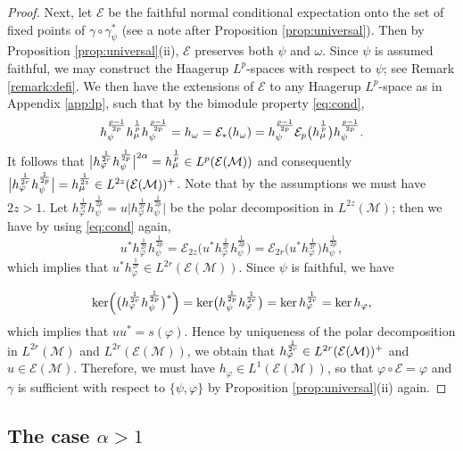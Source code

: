 \documentclass[12pt]{article}
\theoremstyle{definition}
\theoremstyle{remark}
\numberwithin{equation}{section}
\def\cE{\mathcal E}
\def\Me{\mathcal M}
\def\ffi{\varphi}
\begin{document}
\begin{proof}
Next, let $\mathcal E$ be the faithful  normal conditional expectation onto the
set of fixed points of $\gamma\circ\gamma^*_\psi$ (see a note after Proposition \ref{prop:universal}). Then
by Proposition \ref{prop:universal}(ii), $\mathcal E$ preserves both $\psi$ and $\omega$.
Since $\psi$ is assumed faithful, we may construct the Haagerup $L^p$-spaces with respect
to $\psi$; see Remark \ref{remark:defi}. We then have the extensions of $\cE$ to any Haagerup
$L^p$-space as in Appendix \ref{app:lp}, such that  by the bimodule property
\eqref{eq:cond}, 
\[
h_\psi^{p-1\over 2p}h_\mu^{\frac1p}h_\psi^{p-1\over 2p}=h_\omega=\mathcal
E_*(h_\omega)=h_\psi^{p-1\over 2p}\cE_p\bigl(h_\mu^{\frac1p}\bigr)h_\psi^{p-1\over 2p}.
\]
It follows that $\big|h_\ffi^{1\over 2r}h_\psi^{1\over 2p}\big|^{2\alpha}= h_\mu^{\frac1p}\in
L^p(\cE(\Me))$ and consequently $\big|h_\varphi^{\frac1{2r}}h_\psi^{\frac1{2p}}\big|=h_\mu^{1\over
2z}\in L^{2z}(\mathcal E(\Me))^+$. Note that by the  assumptions we must have $2z>1$. 
Let  $h_\varphi^{\frac1{2r}}h_\psi^{\frac1{2p}}=u\big|h_\varphi^{\frac1{2r}}h_\psi^{\frac1{2p}}\big|$ be the
polar decomposition in $L^{2z}(\Me)$; then we have by using \eqref{eq:cond} again,
\[
u^*h_\varphi^{\frac1{2r}}h_\psi^{\frac1{2p}}=\mathcal
E_{2z}\bigl(u^*h_\varphi^{\frac1{2r}}h_\psi^{\frac1{2p}}\bigr)=\mathcal
E_{2r}\bigl(u^*h_\varphi^{\frac1{2r}}\bigr)h_\psi^{\frac1{2p}},
\]
which implies that $u^*h_\varphi^{\frac1{2r}}\in L^{2r}(\cE(\Me))$. Since $\psi$ is
faithful, we have

\[
\ker\Bigl(\bigl(h_\ffi^{1\over2r}h_\psi^{1\over2p}\bigr)^*\Bigr)
=\ker\bigl(h_\psi^{1\over2p}h_\ffi^{1\over2r}\bigr)
=\ker h_\ffi^{1\over2r}=\ker h_\ffi,
\]
which implies that $uu^*=s(\ffi)$.
Hence by uniqueness of the polar decomposition in $L^{2r}(\Me)$ and $L^{2r}(\cE(\Me))$,
we obtain that $h_\ffi^{1\over 2r}\in L^{2r}(\cE(\Me))^+$ and $u\in \cE(\Me)$. 
Therefore, we must have $h_\ffi\in L^1(\cE(\Me))$, so that $\ffi\circ\mathcal E=\ffi$ and $\gamma$ is
sufficient with respect to $\{\psi,\varphi\}$ by Proposition \ref{prop:universal}(ii) again.
\end{proof}


\subsection{The case $\alpha>1$}
\end{document}
